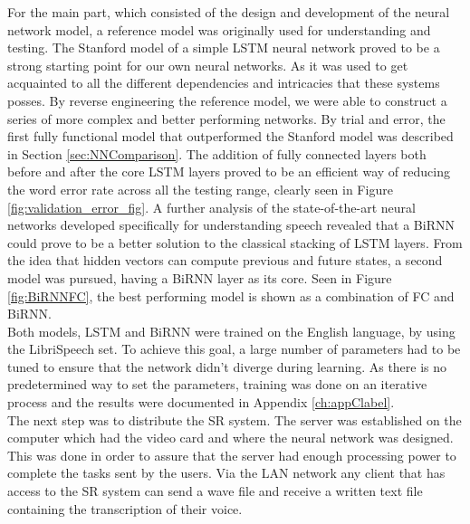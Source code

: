    For the main part, which consisted of the design and development of the neural network model, a reference model was originally used for understanding and testing. The Stanford model of a simple LSTM neural network proved to be a strong starting point for our own neural networks. As it was used to get acquainted to all the different dependencies and intricacies that these systems posses. By reverse engineering the reference model, we were able to construct a series of more complex and better performing networks. By trial and error, the first fully functional model that outperformed the Stanford model was described in Section \ref{sec:NNComparison}. The addition of fully connected layers both before and after the core LSTM layers proved to be an efficient way of reducing the word error rate across all the testing range, clearly seen in Figure \ref{fig:validation_error_fig}. A further analysis of the state-of-the-art neural networks developed specifically for understanding speech revealed that a BiRNN could prove to be a better solution to the classical stacking of LSTM layers. From the idea that hidden vectors can compute previous and future states, a second model was pursued, having a BiRNN layer as its core. Seen in Figure \ref{fig:BiRNNFC}, the best performing model is shown as a combination of FC and BiRNN. \\
   
Both models, LSTM and BiRNN were trained on the English language, by using the LibriSpeech set. To achieve this goal, a large number of parameters had to be tuned to ensure that the network didn't diverge during learning. As there is no predetermined way to set the parameters, training was done on an iterative process and the results were documented in Appendix \ref{ch:appClabel}.\\

The next step was to distribute the SR system. The server was established on the computer which had the video card and where the neural network was designed. This was done in order to assure that the server had enough processing power to complete the tasks sent by the users. Via the LAN network any client that has access to the SR system can send a wave file and receive a written text file containing the transcription of their voice. 
